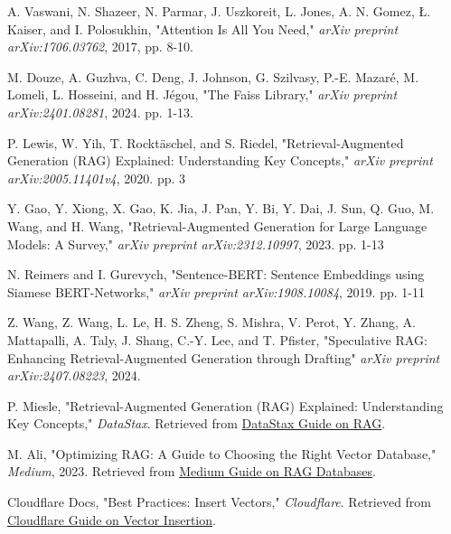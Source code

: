 \documentclass{wseas}
\begin{document}
\begin{thebibliography}{9}

   A. Vaswani, N. Shazeer, N. Parmar, J. Uszkoreit, L. Jones, A. N. Gomez, Ł. Kaiser, and I. Polosukhin, "Attention Is All You Need," \textit{arXiv preprint arXiv:1706.03762}, 2017, pp. 8-10.
  
   M. Douze, A. Guzhva, C. Deng, J. Johnson, G. Szilvasy, P.-E. Mazaré, M. Lomeli, L. Hosseini, and H. Jégou, "The Faiss Library," \textit{arXiv preprint arXiv:2401.08281}, 2024. pp. 1-13.
  
   P. Lewis, W. Yih, T. Rocktäschel, and S. Riedel, "Retrieval-Augmented Generation (RAG) Explained: Understanding Key Concepts," \textit{arXiv preprint arXiv:2005.11401v4}, 2020. pp. 3
  
   Y. Gao, Y. Xiong, X. Gao, K. Jia, J. Pan, Y. Bi, Y. Dai, J. Sun, Q. Guo, M. Wang, and H. Wang, "Retrieval-Augmented Generation for Large Language Models: A Survey," \textit{arXiv preprint arXiv:2312.10997}, 2023. pp. 1-13
  
   N. Reimers and I. Gurevych, "Sentence-BERT: Sentence Embeddings using Siamese BERT-Networks," \textit{arXiv preprint arXiv:1908.10084}, 2019. pp. 1-11
    
   Z. Wang, Z. Wang, L. Le, H. S. Zheng, S. Mishra, V. Perot, Y. Zhang, A. Mattapalli, A. Taly, J. Shang, C.-Y. Lee, and T. Pfister, "Speculative RAG: Enhancing Retrieval-Augmented Generation through Drafting" \textit{arXiv preprint arXiv:2407.08223}, 2024.
  
   P. Miesle, "Retrieval-Augmented Generation (RAG) Explained: Understanding Key Concepts," \textit{DataStax}. Retrieved from \href{https://www.datastax.com/guides/what-is-retrieval-augmented-generation}{DataStax Guide on RAG}.

   M. Ali, "Optimizing RAG: A Guide to Choosing the Right Vector Database," \textit{Medium}, 2023. Retrieved from \href{https://medium.com/@mutahar789/optimizing-rag-a-guide-to-choosing-the-right-vector-database-480f71a33139}{Medium Guide on RAG Databases}.
  
  Cloudflare Docs, "Best Practices: Insert Vectors," \textit{Cloudflare}. Retrieved from \href{https://developers.cloudflare.com/vectorize/best-practices/insert-vectors/}{Cloudflare Guide on Vector Insertion}.
  

\end{thebibliography}
\end{document}

